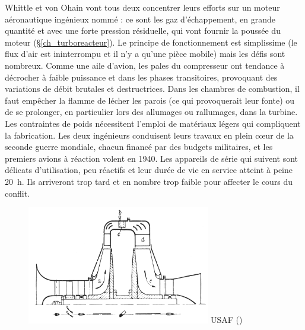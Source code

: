 Whittle et von Ohain vont tous deux concentrer leurs efforts sur un moteur aéronautique ingénieux nommé  : ce sont les gaz d’échappement, en grande quantité et avec une forte pression résiduelle, qui vont fournir la poussée du moteur (\S\ref{ch_turboreacteur}). Le principe de fonctionnement est simplissime (le flux d’air est ininterrompu et il n’y a qu’une pièce mobile) mais les défis sont nombreux. Comme une aile d’avion, les pales du compresseur ont tendance à décrocher à faible puissance et dans les phases transitoires, provoquant des variations de débit brutales et destructrices. Dans les chambres de combustion, il faut empêcher la flamme de lécher les parois (ce qui provoquerait leur fonte) ou de se prolonger, en particulier lors des allumages ou rallumages, dans la turbine. Les contraintes de poids nécessitent l’emploi de matériaux légers qui compliquent la fabrication. Les deux ingénieurs conduisent leurs travaux en plein cœur de la seconde guerre mondiale, chacun financé par des budgets militaires, et les premiers avions à réaction volent en 1940. Les appareils de série qui suivent sont délicats d’utilisation, peu réactifs et leur durée de vie en service atteint à peine \SI{20}{\hour}. Ils arriveront trop tard et en nombre trop faible pour affecter le cours du conflit.

	\begin{figure}
		\begin{center}
			\includegraphics[width=8cm]{images/he_s1.png}
				{ USAF (\pd)}
			\label{fig_turbinia}
		\end{center}
	\end{figure}

